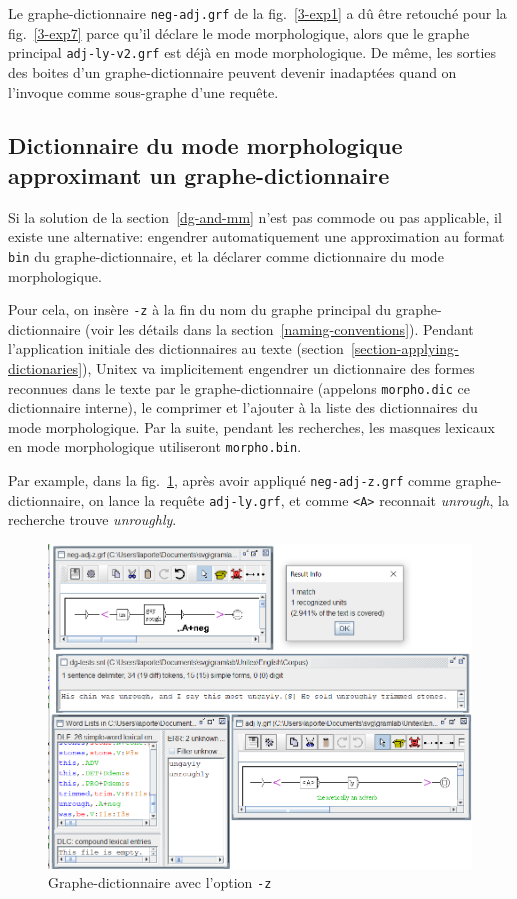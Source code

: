 \bigskip
\noindent Le graphe-dic\-tion\-naire \verb+neg-adj.grf+ de la fig.~\ref{3-exp1} a dû être retouché
pour la fig.~\ref{3-exp7} parce qu'il déclare le mode morphologique, alors que le graphe
principal \verb+adj-ly-v2.grf+ est déjà en mode morphologique. De même, les sorties des
boites d'un graphe-dic\-tion\-naire peuvent devenir inadaptées quand on l'invoque comme
sous-graphe d'une requête.

\subsection{Dictionnaire du mode morphologique approximant un graphe-dictionnaire}
\label{z-and-b-switches}
Si la solution de la section~\ref{dg-and-mm} n'est pas commode ou pas applicable,
il existe une alternative: engendrer automatiquement une approximation au format \verb+bin+ du graphe-dic\-tion\-naire, et la déclarer comme dictionnaire du mode morphologique.

\bigskip
\noindent Pour cela, on insère \verb+-z+ à la fin du nom du graphe principal du graphe-dic\-tion\-naire  (voir les détails dans la section~\ref{naming-conventions}). Pendant l'application initiale des dictionnaires au texte (section~\ref{section-applying-dictionaries}), Unitex va implicitement engendrer un dictionnaire des
formes reconnues dans le texte par le graphe-dic\-tion\-naire (appelons \verb+morpho.dic+ ce
dictionnaire interne), le comprimer et l'ajouter à la liste des dictionnaires du mode morphologique. Par la suite, pendant les recherches, les masques lexicaux en mode morphologique utiliseront \verb+morpho.bin+.

\bigskip
\noindent Par example, dans la fig.~\ref{3-exp2}, après avoir appliqué
\verb+neg-adj-z.grf+ comme graphe-dic\-tion\-naire, on lance la requête \verb+adj-ly.grf+, et comme
\verb+<A>+ reconnait \textit{unrough}, la recherche trouve \textit{unroughly}.

\begin{figure}[th]
\begin{center}
\includegraphics[width=15cm]{resources/img/fig3-exp2.png}
\caption{Graphe-dictionnaire avec l'option \texttt{-z}\label{3-exp2}}
\end{center}
\end{figure}

